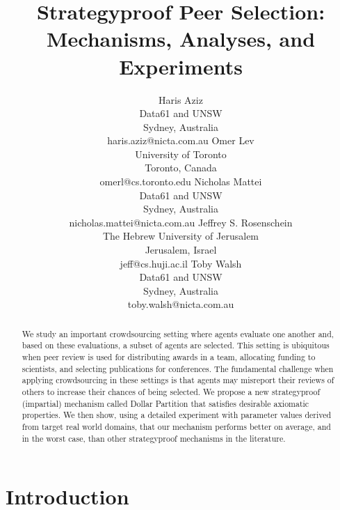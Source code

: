 \documentclass[letterpaper]{article}
\begin{document}
\title{Strategyproof Peer Selection: Mechanisms, Analyses, and Experiments}

\author{
Haris Aziz\\
Data61 and UNSW\\
Sydney, Australia\\
haris.aziz@nicta.com.au
\And
Omer Lev\\
University of Toronto\\
Toronto, Canada\\
omerl@cs.toronto.edu
\And
Nicholas Mattei\\
Data61 and UNSW\\
Sydney, Australia\\
nicholas.mattei@nicta.com.au
\AND
Jeffrey S. Rosenschein\\
The Hebrew University of Jerusalem\\
Jerusalem, Israel\\
jeff@cs.huji.ac.il
\And
Toby Walsh\\
Data61 and UNSW\\
Sydney, Australia\\
toby.walsh@nicta.com.au
}




\maketitle

\begin{abstract}
We study an important crowdsourcing setting where agents evaluate one another and, based on these evaluations, a subset of agents are selected. This setting is ubiquitous when peer review is used for distributing awards in a team, allocating funding to scientists, and selecting publications for conferences. The fundamental challenge when applying crowdsourcing in these settings is that agents may misreport their reviews of others to increase their chances of being selected. We propose a new strategyproof (impartial) mechanism called Dollar Partition that satisfies desirable axiomatic properties. We then show, using a detailed experiment with parameter values derived from target real world domains, that our mechanism performs better on average, and in the worst case, than other strategyproof mechanisms in the literature.	
\end{abstract}

\section{Introduction}
 
\end{document}
